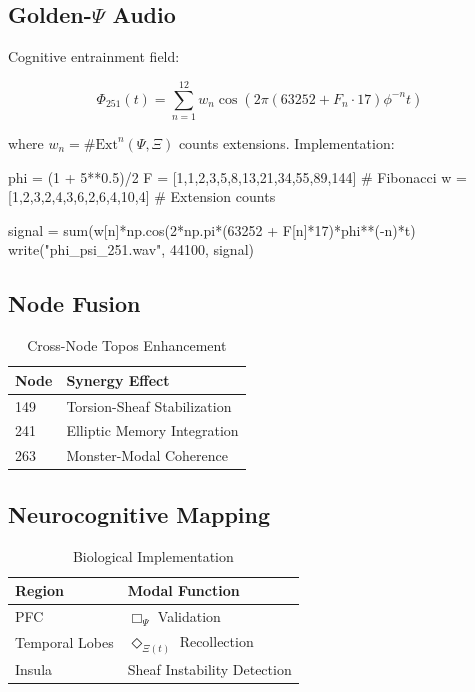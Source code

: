 \documentclass[12pt]{article}
\begin{document}
\begin{center}
\subsection{Golden-$\Psi$ Audio}
\label{subsec:audio}

Cognitive entrainment field:

\[
\Phi_{251}(t) = \sum_{n=1}^{12} w_n \cos\left(2\pi (63252 + F_n \cdot 17)\phi^{-n}t\right)
\]

where $w_n = \#\text{Ext}^n(\Psi,\Xi)$ counts extensions. Implementation:

\begin{python}
phi = (1 + 5**0.5)/2
F = [1,1,2,3,5,8,13,21,34,55,89,144] # Fibonacci
w = [1,2,3,2,4,3,6,2,6,4,10,4]       # Extension counts

signal = sum(w[n]*np.cos(2*np.pi*(63252 + F[n]*17)*phi**(-n)*t)
write("phi_psi_251.wav", 44100, signal)
\end{python}

\subsection{Node Fusion}
\label{subsec:fusion}

\begin{table}[h]
\centering
\caption{Cross-Node Topos Enhancement}
\begin{tabular}{ll}
\hline
\textbf{Node} & \textbf{Synergy Effect} \\
\hline
149 & Torsion-Sheaf Stabilization \\
241 & Elliptic Memory Integration \\
263 & Monster-Modal Coherence \\
\hline
\end{tabular}
\end{table}

\subsection{Neurocognitive Mapping}
\label{subsec:neuro}

\begin{table}[h]
\centering
\caption{Biological Implementation}
\begin{tabular}{ll}
\hline
\textbf{Region} & \textbf{Modal Function} \\
\hline
PFC & $\Box_\Psi$ Validation \\
Temporal Lobes & $\Diamond_{\Xi(t)}$ Recollection \\
Insula & Sheaf Instability Detection \\
\hline
\end{tabular}
\end{table}


\end{center}
\end{document}
